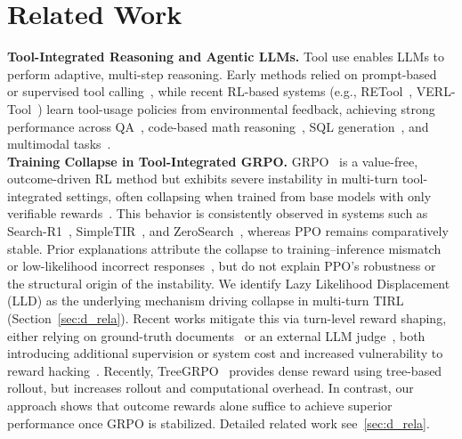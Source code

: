 \section{Related Work}
\textbf{Tool-Integrated Reasoning and Agentic LLMs.}
Tool use enables LLMs to perform adaptive, multi-step reasoning. Early methods relied on prompt-based~\citep{lu2023chameleon,shen2023hugginggpt} or supervised tool calling~\citep{gou2023tora,qin2023toolllm}, while recent RL-based systems (e.g., RETool~\citep{feng2025retool}, VERL-Tool~\citep{jiang2025verltool}) learn tool-usage policies from environmental feedback, achieving strong performance across QA~\citep{jin2025search}, code-based math reasoning~\citep{xue2025simpletir}, SQL generation~\citep{jiang2025verltool}, and multimodal tasks~\citep{gao2024multi}.
\\
\textbf{Training Collapse in Tool-Integrated GRPO.}
GRPO~\citep{guo2025deepseek} is a value-free, outcome-driven RL method but exhibits severe instability in multi-turn tool-integrated settings, often collapsing when trained from base models with only verifiable rewards~\citep{jin2025search}. This behavior is consistently observed in systems such as Search-R1~\citep{jin2025search}, SimpleTIR~\cite{xue2025simpletir}, and ZeroSearch~\cite{sun2025zerosearch}, whereas PPO remains comparatively stable. Prior explanations attribute the collapse to training–inference mismatch~\citep{liuspeed} or low-likelihood incorrect responses~\citep{xue2025simpletir}, but do not explain PPO’s robustness or the structural origin of the instability. We identify Lazy Likelihood Displacement (LLD) as the underlying mechanism driving collapse in multi-turn TIRL (Section~\ref{sec:d_rela}). Recent works mitigate this via turn-level reward shaping, either relying on ground-truth documents~\cite{zheng2025stepsearch} or an external LLM judge~\citep{zhang2025criticsearch}, both introducing additional supervision or system cost and increased vulnerability to reward hacking~\citep{guo2025deepseek}. Recently, TreeGRPO~\cite{ji2025tree} provides dense reward using tree-based rollout, but increases rollout and computational overhead. In contrast, our approach shows that outcome rewards alone suffice to achieve superior performance once GRPO is stabilized. Detailed related work see~\cref{sec:d_rela}.  
